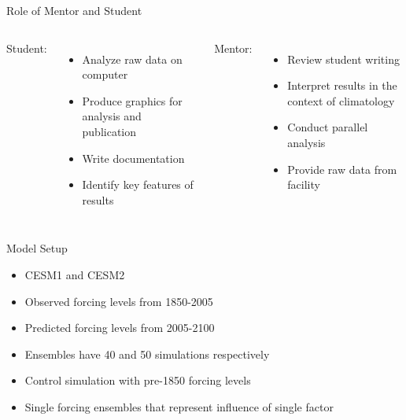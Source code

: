 \documentclass{beamer}
\begin{document}
\begin{frame}{Role of Mentor and Student}
  \begin{columns}[t]
    Student:
    \begin{itemize}
    \item Analyze raw data on computer
    \item Produce graphics for analysis and publication
    \item Write documentation
    \item Identify key features of results
    \end{itemize}
    Mentor:
    \begin{itemize}
    \item Review student writing
    \item Interpret results in the context of climatology
    \item Conduct parallel analysis
    \item Provide raw data from facility
    \end{itemize}
  \end{columns}

\end{frame}

\begin{frame}{Model Setup}
  \begin{itemize}
  \item CESM1 \citep{kay2015community} and CESM2 \citep{danabasoglu2020community}
  \item Observed forcing levels from 1850-2005
  \item Predicted forcing levels from 2005-2100
  \item Ensembles have 40 and 50 simulations respectively
  \item Control simulation with pre-1850 forcing levels
  \item Single forcing ensembles that represent influence of single factor
  \end{itemize}
\end{frame}
\end{document}
